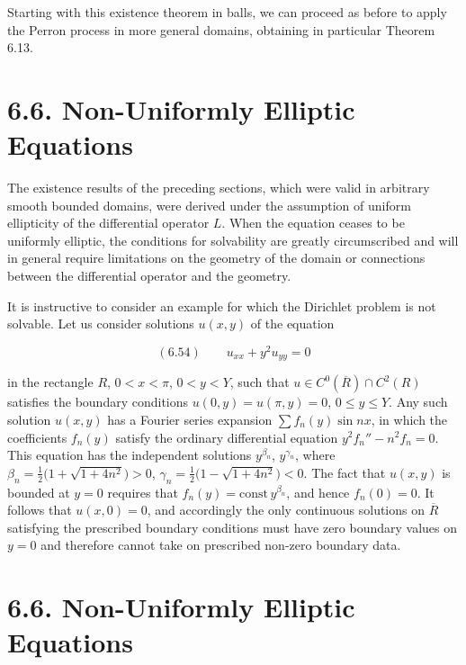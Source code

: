 Starting with this existence theorem in balls, we can proceed as before to apply the Perron process in more general domains, obtaining in particular Theorem 6.13.

\section*{6.6. Non-Uniformly Elliptic Equations}

The existence results of the preceding sections, which were valid in arbitrary smooth bounded domains, were derived under the assumption of uniform ellipticity of the differential operator $L$. When the equation ceases to be uniformly elliptic, the conditions for solvability are greatly circumscribed and will in general require limitations on the geometry of the domain or connections between the differential operator and the geometry.

It is instructive to consider an example for which the Dirichlet problem is not solvable. Let us consider solutions $u(x, y)$ of the equation

\begin{equation*}
(6.54) \qquad u_{xx}+y^2u_{yy}=0
\end{equation*}

in the rectangle $R$, $0<x<\pi$, $0<y<Y$, such that $u\in C^0(\overline{R})\cap C^2(R)$ satisfies the boundary conditions $u(0,y)=u(\pi,y)=0$, $0\le y\le Y$. Any such solution $u(x,y)$ has a Fourier series expansion $\sum f_n(y)\sin nx$, in which the coefficients $f_n(y)$ satisfy the ordinary differential equation $y^2 f_n''-n^2 f_n=0$. This equation has the independent solutions $y^{\beta_n}$, $y^{\gamma_n}$, where $\beta_n=\tfrac12\bigl(1+\sqrt{1+4n^2}\bigr)>0$, $\gamma_n=\tfrac12\bigl(1-\sqrt{1+4n^2}\bigr)<0$. The fact that $u(x, y)$ is bounded at $y=0$ requires that $f_n(y)=\mathrm{const}\, y^{\beta_n}$, and hence $f_n(0)=0$. It follows that $u(x,0)=0$, and accordingly the only continuous solutions on $\overline{R}$ satisfying the prescribed boundary conditions must have zero boundary values on $y=0$ and therefore cannot take on prescribed non-zero boundary data.


\section*{6.6. Non-Uniformly Elliptic Equations}

